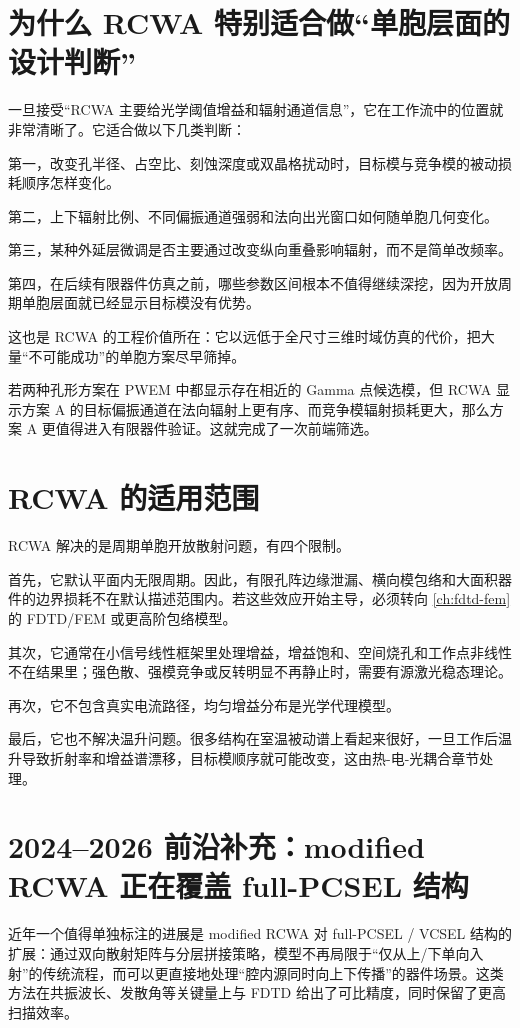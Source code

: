 \section{为什么 RCWA 特别适合做“单胞层面的设计判断”}
一旦接受“RCWA 主要给光学阈值增益和辐射通道信息”，它在工作流中的位置就非常清晰了。它适合做以下几类判断：

第一，改变孔半径、占空比、刻蚀深度或双晶格扰动时，目标模与竞争模的被动损耗顺序怎样变化。

第二，上下辐射比例、不同偏振通道强弱和法向出光窗口如何随单胞几何变化。

第三，某种外延层微调是否主要通过改变纵向重叠影响辐射，而不是简单改频率。

第四，在后续有限器件仿真之前，哪些参数区间根本不值得继续深挖，因为开放周期单胞层面就已经显示目标模没有优势。

这也是 RCWA 的工程价值所在：它以远低于全尺寸三维时域仿真的代价，把大量“不可能成功”的单胞方案尽早筛掉。

\begin{ExampleBox}
若两种孔形方案在 PWEM 中都显示存在相近的 Gamma 点候选模，但 RCWA 显示方案 A 的目标偏振通道在法向辐射上更有序、而竞争模辐射损耗更大，那么方案 A 更值得进入有限器件验证。这就完成了一次前端筛选。
\end{ExampleBox}

\section{RCWA 的适用范围}
RCWA 解决的是周期单胞开放散射问题，有四个限制。

首先，它默认平面内无限周期。因此，有限孔阵边缘泄漏、横向模包络和大面积器件的边界损耗不在默认描述范围内。若这些效应开始主导，必须转向 \cref{ch:fdtd-fem} 的 FDTD/FEM 或更高阶包络模型。

其次，它通常在小信号线性框架里处理增益，增益饱和、空间烧孔和工作点非线性不在结果里；强色散、强模竞争或反转明显不再静止时，需要有源激光稳态理论。

再次，它不包含真实电流路径，均匀增益分布是光学代理模型。

最后，它也不解决温升问题。很多结构在室温被动谱上看起来很好，一旦工作后温升导致折射率和增益谱漂移，目标模顺序就可能改变，这由热-电-光耦合章节处理。

\section{2024--2026 前沿补充：modified RCWA 正在覆盖 full-PCSEL 结构}
近年一个值得单独标注的进展是 modified RCWA 对 full-PCSEL / VCSEL 结构的扩展：通过双向散射矩阵与分层拼接策略，模型不再局限于“仅从上/下单向入射”的传统流程，而可以更直接地处理“腔内源同时向上下传播”的器件场景\cite{xu2024modifiedrcwa}。这类方法在共振波长、发散角等关键量上与 FDTD 给出了可比精度，同时保留了更高扫描效率。

